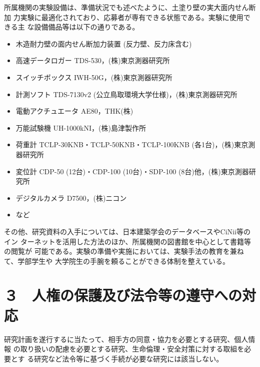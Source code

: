 \documentclass[11pt,a4paper,uplatex,dvipdfmx]{ujarticle} 		%
\newcommand{\研究課題名}{伝統的な木造土塗り壁の復元力に及ぼす軸組の影響に関する実験研究}
\newcommand{\研究機関名}{公立鳥取環境大学}
\newcommand{\研究代表者氏名}{中治弘行}
\newcommand{\私}{{\研究代表者氏名}}
\newcommand{\研究期間の最終元号年度}{8}  %
\begin{document}
所属機関の実験設備は、準備状況でも述べたように、土塗り壁の実大面内せん断加
力実験に最適化されており、応募者が専有できる状態である。実験に使用できる主
な設備備品等は以下の通りである。

\begin{itemize}
\itemsep=-2pt
\item 木造耐力壁の面内せん断加力装置 (反力壁、反力床含む)
\item 高速データロガー TDS-530，(株)東京測器研究所
\item スイッチボックス IWH-50G，(株)東京測器研究所
\item 計測ソフト TDS-7130v2 (公立鳥取環境大学仕様)，(株)東京測器研究所
\item 電動アクチュエータ AE80，THK(株)
\item 万能試験機 UH-1000kNI，(株)島津製作所
\item 荷重計 TCLP-30KNB・TCLP-50KNB・TCLP-100KNB (各1台)，(株)東京測器研究所
\item 変位計 CDP-50 (12台)・CDP-100 (10台)・SDP-100 (8台)他，(株)東京測器研究所
\item デジタルカメラ D7500，(株)ニコン
\item など
\end{itemize}

その他、研究資料の入手については、日本建築学会のデータベースやCiNii等のイン
ターネットを活用した方法のほか、所属機関の図書館を中心として書籍等の閲覧が
可能である。実験の準備や実施においては、実験手法の教育を兼ねて、学部学生や
大学院生の手腕を頼ることができる体制を整えている。




\section{３　人権の保護及び法令等の遵守への対応}

研究計画を遂行するに当たって、相手方の同意・協力を必要とする研究、個人情報
の取り扱いの配慮を必要とする研究、生命倫理・安全対策に対する取組を必要とす
る研究など法令等に基づく手続が必要な研究には該当しない。




\end{document}
